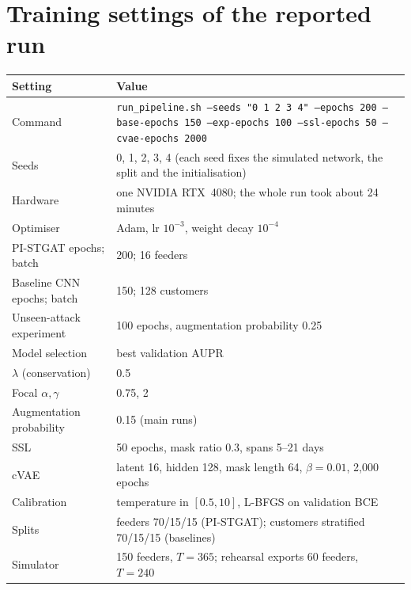 \documentclass[11pt,a4paper]{article}
\theoremstyle{plain}
\theoremstyle{definition}
\theoremstyle{remark}
\begin{document}
\section{Training settings of the reported run}
\label{app:settings}
\begin{table}[htbp]
\centering\small
\begin{tabular}{@{}p{5.2cm}p{9.4cm}@{}}
\toprule
Setting & Value\\
\midrule
Command & \texttt{run\_pipeline.sh --seeds "0 1 2 3 4" --epochs 200 --base-epochs 150 --exp-epochs 100 --ssl-epochs 50 --cvae-epochs 2000}\\
Seeds & 0, 1, 2, 3, 4 (each seed fixes the simulated network, the split and the initialisation)\\
Hardware & one NVIDIA RTX~4080; the whole run took about 24 minutes\\
Optimiser & Adam, lr $10^{-3}$, weight decay $10^{-4}$\\
PI-STGAT epochs; batch & 200; 16 feeders\\
Baseline CNN epochs; batch & 150; 128 customers\\
Unseen-attack experiment & 100 epochs, augmentation probability 0.25\\
Model selection & best validation AUPR\\
$\lambda$ (conservation) & 0.5\\
Focal $\alpha,\gamma$ & 0.75, 2\\
Augmentation probability & 0.15 (main runs)\\
SSL & 50 epochs, mask ratio 0.3, spans 5--21 days\\
cVAE & latent 16, hidden 128, mask length 64, $\beta=0.01$, 2{,}000 epochs\\
Calibration & temperature in $[0.5,10]$, L-BFGS on validation BCE\\
Splits & feeders 70/15/15 (PI-STGAT); customers stratified 70/15/15 (baselines)\\
Simulator & 150 feeders, $T=365$; rehearsal exports 60 feeders, $T=240$\\
\bottomrule
\end{tabular}
\end{table}
\end{document}
